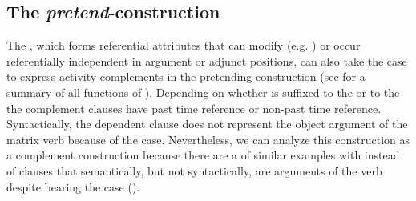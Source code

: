 
\subsection{The \textit{pretend}-construction}
\label{ssec:PretendConstruction}
The  , which forms referential attributes that can modify  (e.g. ) or occur referentially independent in argument or adjunct positions, can also take the  case to express activity complements in the pretending-construction  (see  for a summary of all functions of ). Depending on whether  is suffixed to the   or to the   the complement clauses have past time reference or non-past time reference. Syntactically, the dependent clause does not represent the object argument of the matrix verb  because of the  case. Nevertheless, we can analyze this construction as a complement construction because there are a  of similar examples with  instead of clauses that semantically, but not syntactically, are arguments of the verb  despite bearing the  case ().
%
